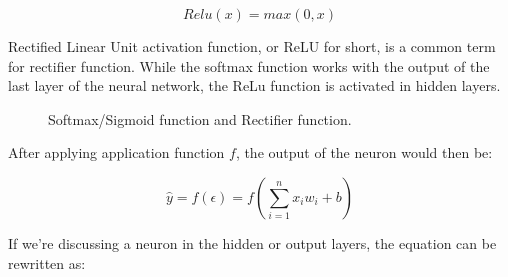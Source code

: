 \begin{equation}
	Relu(x) = max(0, x)
\end{equation}

Rectified Linear Unit activation function, or ReLU for short, is a common term for rectifier function.\newline
While the softmax function works with the output of the last layer of the neural network, the ReLu function is activated in hidden layers.
\begin{figure}[h]
	\centering
	\begin{minipage}{.5\textwidth}
		\centering
	\end{minipage}%
	\begin{minipage}{.5\textwidth}
		\centering
		
	\end{minipage}
	\caption{Softmax/Sigmoid function and Rectifier function.}
	\label{fig:foftmaxrelu}
\end{figure}

After applying application function $f$, the output of the neuron would then be: 

\begin{equation}
	\hat{y} = f (\epsilon) = f (\sum_{i=1}^{n} x_i w_i + b)
	\label{eq:forpass}
\end{equation}

If we're discussing a neuron in the hidden or output layers, the equation can be rewritten as:

